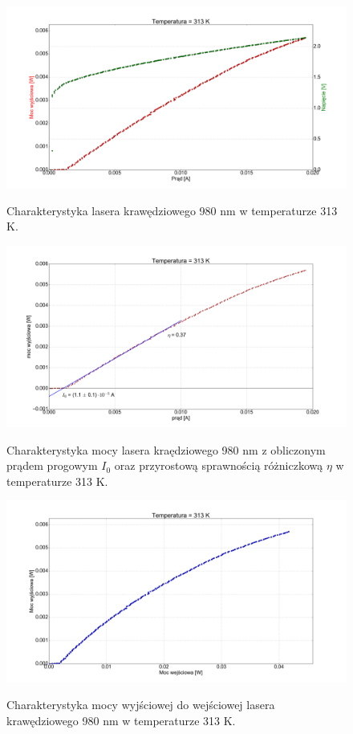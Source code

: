 \documentclass[a4paper, portrait,12pt]{report}
\begin{document}
\begin{figure}
\center
  \includegraphics[scale=0.30]{plot980/temp_40_IVL.png}
  \label{rys1}
  \caption{Charakterystyka lasera krawędziowego 980 nm w temperaturze 313 K.} 
\end{figure}

\begin{figure}
\center
  \includegraphics[scale=0.30]{plot980/temp_40_fit.png}
  \label{rys1}
  \caption{Charakterystyka mocy lasera kraędziowego 980 nm z obliczonym prądem progowym $I_0$ oraz przyrostową sprawnością różniczkową $\eta$ w temperaturze 313 K.} 
\end{figure}

\begin{figure}
\center
  \includegraphics[scale=0.30]{plot980/temp_40_power.png}
  \label{rys1}
  \caption{Charakterystyka mocy wyjściowej do wejściowej lasera krawędziowego 980 nm w temperaturze 313 K.} 
\end{figure}
\end{document}
